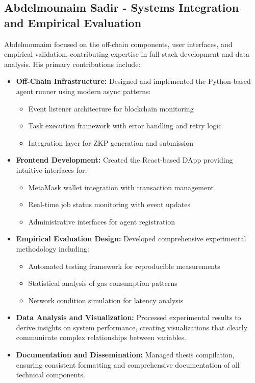 \subsection{Abdelmounaim Sadir - Systems Integration and Empirical Evaluation}

Abdelmounaim focused on the off-chain components, user interfaces, and empirical validation, contributing expertise in full-stack development and data analysis. His primary contributions include:

\begin{itemize}
    \item \textbf{Off-Chain Infrastructure:} Designed and implemented the Python-based agent runner using modern async patterns:
    \begin{itemize}
        \item Event listener architecture for blockchain monitoring
        \item Task execution framework with error handling and retry logic
        \item Integration layer for ZKP generation and submission
    \end{itemize}
    
    \item \textbf{Frontend Development:} Created the React-based DApp providing intuitive interfaces for:
    \begin{itemize}
        \item MetaMask wallet integration with transaction management
        \item Real-time job status monitoring with event updates
        \item Administrative interfaces for agent registration
    \end{itemize}
    
    \item \textbf{Empirical Evaluation Design:} Developed comprehensive experimental methodology including:
    \begin{itemize}
        \item Automated testing framework for reproducible measurements
        \item Statistical analysis of gas consumption patterns
        \item Network condition simulation for latency analysis
    \end{itemize}
    
    \item \textbf{Data Analysis and Visualization:} Processed experimental results to derive insights on system performance, creating visualizations that clearly communicate complex relationships between variables.
    
    \item \textbf{Documentation and Dissemination:} Managed thesis compilation, ensuring consistent formatting and comprehensive documentation of all technical components.
\end{itemize}

